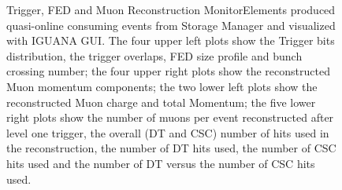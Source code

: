 \documentclass[a4paper]{cmspaper}
\begin{document}
%
\begin{figure}[hbtp]
  \begin{center}
\caption{Trigger, FED and Muon Reconstruction MonitorElements produced quasi-online consuming events from Storage Manager and visualized 
with IGUANA GUI. 
The four upper left plots show the Trigger bits distribution, the trigger overlaps, FED size profile and bunch crossing number; 
the four upper right plots show the reconstructed Muon momentum components; 
the two lower left plots show the reconstructed Muon charge and total Momentum; 
the five lower right plots show the number of muons per event reconstructed after level one trigger, the overall (DT and CSC) number 
of hits used in the reconstruction, the number of DT hits used, the number of CSC hits used and the number of DT versus the number of CSC 
hits used.}
\label{fig:muonrecolayout}
 \end{center}
\end{figure}
\end{document}
